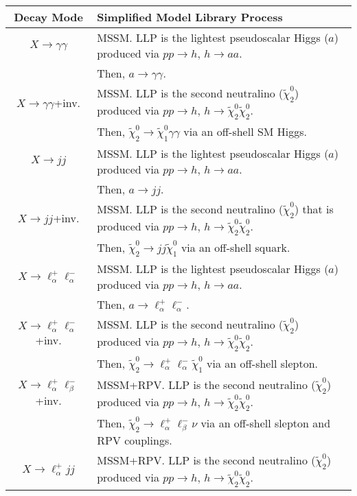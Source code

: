 \begin{table}
\begin{center}
\begin{tabular}{ |c|l|} 
 \hline
Decay Mode & Simplified Model Library Process \\
\hline\hline
$X\rightarrow \gamma\gamma$ & MSSM. LLP is the lightest pseudoscalar Higgs ($a$)   produced via $pp\rightarrow h$, $h\rightarrow aa$.    \\
&  Then, $a\rightarrow\gamma\gamma$. \\
\hline
$X\rightarrow \gamma\gamma$+inv. & MSSM. LLP is the second neutralino  ($\tilde\chi_2^0$)   produced via $pp\rightarrow h$, $h\rightarrow \tilde\chi_2^0\tilde\chi_2^0$.    \\
&  Then,  $\tilde\chi_2^0\rightarrow\tilde\chi_1^0\gamma\gamma$ via an off-shell SM Higgs. \\
\hline
$X\rightarrow jj$ & MSSM. LLP is the lightest pseudoscalar Higgs ($a$)   produced via $pp\rightarrow h$, $h\rightarrow aa$.    \\
&  Then, $a\rightarrow jj$. \\
\hline
$X\rightarrow jj$+inv.& MSSM. LLP is the second neutralino ($\tilde\chi_2^0$) that is produced via $pp\rightarrow h $, $h\rightarrow \tilde\chi_2^0\tilde\chi_2^0$.   \\
&  Then, $\tilde\chi_2^0\rightarrow jj\tilde\chi_1^0$  via an  off-shell  squark.\\
\hline
$X\rightarrow \ell_\alpha^+\ell_\alpha^-$ & MSSM. LLP is the lightest pseudoscalar Higgs ($a$)   produced via $pp\rightarrow h$, $h\rightarrow aa$.    \\
&  Then, $a\rightarrow\ell_\alpha^+\ell_\alpha^-$. \\
\hline
$X\rightarrow \ell_\alpha^+\ell_\alpha^-$+inv. & MSSM.  LLP is the second neutralino  ($\tilde\chi_2^0$)   produced via $pp\rightarrow h$, $h\rightarrow \tilde\chi_2^0\tilde\chi_2^0$.   \\
&  Then, $\tilde\chi_2^0\rightarrow\ell_\alpha^+\ell_\alpha^-\tilde\chi^0_1$ via  an off-shell slepton.\\
\hline
$X\rightarrow \ell_\alpha^+\ell_\beta^-$+inv. & MSSM+RPV.  LLP is the second neutralino ($\tilde\chi_2^0$)  produced via $pp\rightarrow h$, $h\rightarrow \tilde\chi_2^0\tilde\chi_2^0$.   \\
&  Then, $\tilde\chi_2^0\rightarrow\ell_\alpha^+\ell_\beta^-\nu$ via  an off-shell slepton and RPV couplings.\\
\hline
$X\rightarrow \ell_\alpha^+jj$ & MSSM+RPV.  LLP is the second neutralino ($\tilde\chi_2^0$)  produced via $pp\rightarrow h$, $h\rightarrow \tilde\chi_2^0\tilde\chi_2^0$.   \\

\end{tabular}
\end{center}
\end{table}
